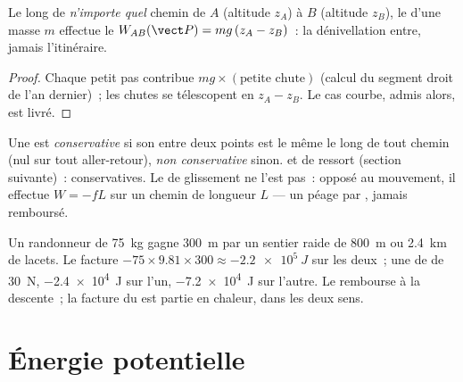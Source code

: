 \begin{proposition}\label{prop:g12:work-and-energy:weight}
Le long de \emph{n'importe quel} chemin de $A$ (altitude $z_A$) à $B$
(altitude $z_B$), le  d'une masse $m$ effectue le
 $W_{AB}(\vect P) = mg\,(z_A - z_B)$~: la dénivellation
entre, jamais l'itinéraire.
\end{proposition}

\begin{proof}
Chaque petit pas contribue $mg \times (\text{petite chute})$
(calcul du segment droit de l'an dernier)~; les chutes se
télescopent en $z_A - z_B$. Le cas courbe, admis alors, est livré.
\end{proof}

\begin{definition}\label{def:g12:work-and-energy:conservative}
Une  est \emph{conservative} si son
 entre deux points est le même le long de tout chemin
(nul sur tout aller-retour), \emph{non conservative}%
 sinon.  et
 de ressort (section suivante)~: conservatives. Le
 de glissement ne l'est pas~: opposé au mouvement, il
effectue $W = -fL$ sur un chemin de longueur $L$ --- un péage par
, jamais remboursé.
\end{definition}

\begin{example}\label{ex:g12:work-and-energy:trails}
Un randonneur de \qty{75}{kg} gagne \qty{300}{m} par un sentier raide
de \qty{800}{m} ou \qty{2.4}{km} de lacets. Le  facture
$-75 \times 9.81 \times 300 \approx \qty{-2.2e5}{J}$ sur les deux~;
une  de  de \qty{30}{N},
\qty{-2.4e4}{J} sur l'un, \qty{-7.2e4}{J} sur l'autre. Le
 rembourse à la descente~; la facture du
 est partie en chaleur, dans les deux sens.
\end{example}

\section{Énergie potentielle}

